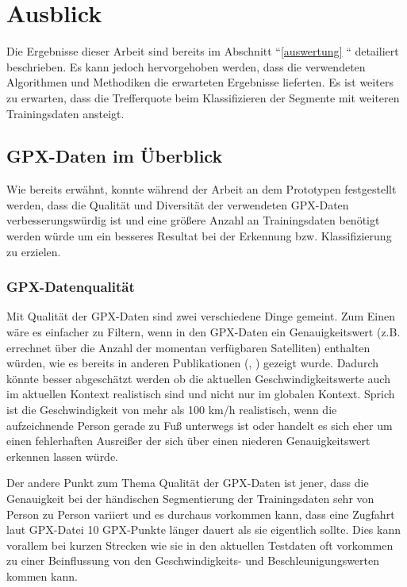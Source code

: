 \chapter{Ausblick}
Die Ergebnisse dieser Arbeit sind bereits im Abschnitt ``\ref{auswertung} `` detailiert beschrieben. Es kann jedoch hervorgehoben werden, dass die verwendeten Algorithmen und Methodiken die erwarteten Ergebnisse lieferten. Es ist weiters zu erwarten, dass die Trefferquote beim Klassifizieren der Segmente mit weiteren Trainingsdaten ansteigt. 

\section{GPX-Daten im Überblick}
Wie bereits erwähnt, konnte während der Arbeit an dem Prototypen festgestellt werden, dass die Qualität und Diversität der verwendeten GPX-Daten verbesserungswürdig ist und eine größere Anzahl an Trainingsdaten benötigt werden würde um ein besseres Resultat bei der Erkennung bzw. Klassifizierung zu erzielen. 

\subsection{GPX-Datenqualität}
Mit Qualität der GPX-Daten sind zwei verschiedene Dinge gemeint. Zum Einen wäre es einfacher zu Filtern, wenn in den GPX-Daten ein Genauigkeitswert (z.B. errechnet über die Anzahl der momentan verfügbaren Satelliten) enthalten würden, wie es bereits in anderen Publikationen (\cite{stenneth_transportation_2011}, \cite{nadine_schussler_improving_2011}) gezeigt wurde. Dadurch könnte besser abgeschätzt werden ob die aktuellen Geschwindigkeitswerte auch im aktuellen Kontext realistisch sind und nicht nur im globalen Kontext. Sprich ist die Geschwindigkeit von mehr als 100 km/h realistisch, wenn die aufzeichnende Person gerade zu Fuß unterwegs ist oder handelt es sich eher um einen fehlerhaften Ausreißer der sich über einen niederen Genauigkeitswert erkennen lassen würde.

Der andere Punkt zum Thema Qualität der GPX-Daten ist jener, dass die Genauigkeit bei der händischen Segmentierung der Trainingsdaten sehr von Person zu Person variiert und es durchaus vorkommen kann, dass eine Zugfahrt laut GPX-Datei 10 GPX-Punkte länger dauert als sie eigentlich sollte. Dies kann vorallem bei kurzen Strecken wie sie in den aktuellen Testdaten oft vorkommen zu einer Beinflussung von den Geschwindigkeits- und Beschleunigungswerten kommen kann. 

